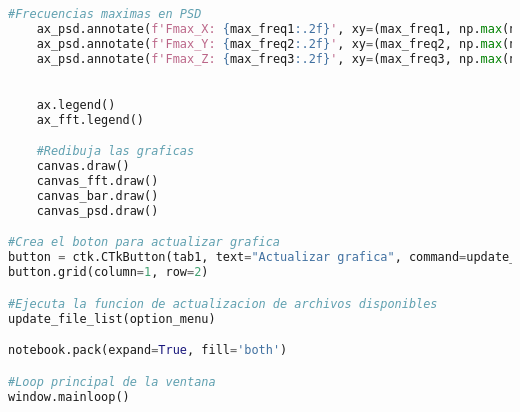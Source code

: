 \begin{lstlisting}[language=Python, caption=Código para interfaz gráfica de control y monitoreo]
    #Frecuencias maximas en PSD
    ax_psd.annotate(f'Fmax_X: {max_freq1:.2f}', xy=(max_freq1, np.max(np.abs(xfil_psd[:len(positive_freq)]))), xytext=(-10 if max_freq1 > median_freq else 10,30), textcoords='offset points', arrowprops=dict(arrowstyle='->'))
    ax_psd.annotate(f'Fmax_Y: {max_freq2:.2f}', xy=(max_freq2, np.max(np.abs(yfil_psd[:len(positive_freq)]))), xytext=(-10 if max_freq2 > median_freq else 10,10), textcoords='offset points', arrowprops=dict(arrowstyle='->'))
    ax_psd.annotate(f'Fmax_Z: {max_freq3:.2f}', xy=(max_freq3, np.max(np.abs(zfil_psd[:len(positive_freq)]))), xytext=(-10 if max_freq3 > median_freq else 10,-10), textcoords='offset points', arrowprops=dict(arrowstyle='->'))

    
    ax.legend()
    ax_fft.legend()

    #Redibuja las graficas
    canvas.draw()
    canvas_fft.draw()
    canvas_bar.draw()
    canvas_psd.draw()

#Crea el boton para actualizar grafica
button = ctk.CTkButton(tab1, text="Actualizar grafica", command=update_plots)
button.grid(column=1, row=2)

#Ejecuta la funcion de actualizacion de archivos disponibles
update_file_list(option_menu)

notebook.pack(expand=True, fill='both')

#Loop principal de la ventana
window.mainloop()

\end{lstlisting}

